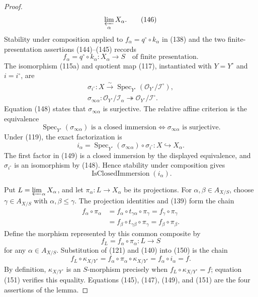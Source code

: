 \begin{proof}
\[      \varprojlim_\alpha X_\alpha.                             \tag{146}
  \]
  Stability under composition applied to
  $f_\alpha=q^\circ\circ k_\alpha$ in (138) and the two
  finite-presentation assertions (144)--(145) records
  \[
    f_\alpha=q^\circ\circ k_\alpha\colon X_\alpha\to S
      \quad\text{of finite presentation}.                      \tag{147}
  \]
  The isomorphism (115a) and quotient map (117), instantiated with
  $Y=Y^\circ$ and $i=i^\circ$, are
  \[
  \begin{gathered}
    \sigma_{i^\circ}\colon X\xrightarrow{\sim}
      \operatorname{Spec}_{Y^\circ}
        (\mathcal O_{Y^\circ}/\mathcal I^\circ),\\
    \sigma_{\infty\alpha}\colon
      \mathcal O_{Y^\circ}/\mathcal I_\alpha
      \twoheadrightarrow\mathcal O_{Y^\circ}/\mathcal I^\circ.
  \end{gathered}                                                  \tag{148}
  \]
  Equation (148) states that $\sigma_{\infty\alpha}$ is surjective.  The
  relative affine criterion is the equivalence
  \[
    \operatorname{Spec}_{Y^\circ}(\sigma_{\infty\alpha})
      \text{ is a closed immersion}
      \Longleftrightarrow
    \sigma_{\infty\alpha}\text{ is surjective}.
  \]
  Under (119), the exact factorization is
  \[
    i_\alpha
      =\operatorname{Spec}_{Y^\circ}(\sigma_{\infty\alpha})
         \circ\sigma_{i^\circ}\colon X\hookrightarrow X_\alpha. \tag{149}
  \]
  The first factor in (149) is a closed immersion by the displayed
  equivalence, and $\sigma_{i^\circ}$ is an isomorphism by (148).  Hence
  stability under composition gives
  \[
    \operatorname{IsClosedImmersion}(i_\alpha).
  \]

  Put $L=\varprojlim_\alpha X_\alpha$, and let
  $\pi_\alpha\colon L\to X_\alpha$ be its projections.  For
  $\alpha,\beta\in A_{X/S}$, choose
  $\gamma\in A_{X/S}$ with $\alpha,\beta\leq\gamma$.  The projection
  identities and (139) form the chain
  \[
  \begin{aligned}
    f_\alpha\circ\pi_\alpha
      &=f_\alpha\circ t_{\gamma\alpha}\circ\pi_\gamma
       =f_\gamma\circ\pi_\gamma\\
      &=f_\beta\circ t_{\gamma\beta}\circ\pi_\gamma
       =f_\beta\circ\pi_\beta.
  \end{aligned}
  \]
  Define the morphism represented by this common composite by
  \[
    f_L=f_\alpha\circ\pi_\alpha\colon L\to S                    \tag{150}
  \]
  for any $\alpha\in A_{X/S}$.  Substitution of (121) and (140) into (150)
  is the chain
  \[
    f_L\circ\kappa_{X/Y^\circ}
      =f_\alpha\circ\pi_\alpha\circ\kappa_{X/Y^\circ}
      =f_\alpha\circ i_\alpha
      =f.                                                        \tag{151}
  \]
  By definition, $\kappa_{X/Y^\circ}$ is an $S$-morphism precisely when
  $f_L\circ\kappa_{X/Y^\circ}=f$; equation (151) verifies this equality.
  Equations (145), (147), (149),
  and (151) are the four assertions of the lemma.
\end{proof}

